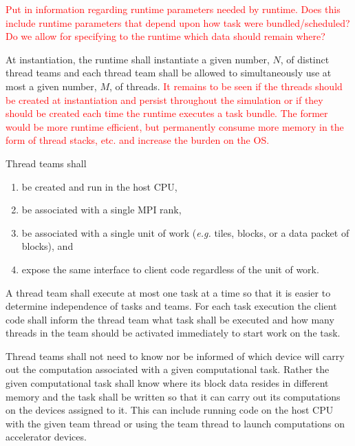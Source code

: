 \documentclass{article}
\begin{document}
\textcolor{red}{Put in information regarding runtime parameters needed by
runtime.  Does this include runtime parameters that depend upon how task were
bundled/scheduled?}\\

\textcolor{red}{Do we allow for specifying to the runtime which data should
remain where?}\\

\begin{req}
At instantiation, the runtime shall instantiate a given number, $N$, of distinct
thread teams and each thread team shall be allowed to simultaneously use
at most a given number, $M$, of threads.  \textcolor{red}{It remains to be seen
if the threads should be created at instantiation and persist throughout the
simulation or if they should be created each time the runtime executes a task
bundle.  The former would be more runtime efficient, but permanently consume
more memory in the form of thread stacks, etc. and increase the burden on the
OS.}
\end{req}

\begin{req}
Thread teams shall
\begin{enumerate}
\item{be created and run in the host CPU,}
\item{be associated with a single MPI rank,}
\item{be associated with a single unit of work (\textit{e.g.} tiles, blocks, or a
data packet of blocks), and}
\item{expose the same interface to client code regardless of the unit of work.}
\end{enumerate}
\end{req}

\begin{req}
A thread team shall execute at most one task at a time so that it is easier to
determine independence of tasks and teams.  For each task execution the client
code shall inform the thread team what task shall be executed and how many
threads in the team should be activated immediately to start work on the task.
\end{req}

\begin{req}
Thread teams shall not need to know nor be informed of which device will carry
out the computation associated with a given computational task.  Rather the
given computational task shall know where its block data resides in different
memory and the task shall be written so that it can carry out its computations
on the devices assigned to it.  This can include running code on the host CPU
with the given team thread or using the team thread to launch computations on
accelerator devices.
\end{req}
\end{document}
